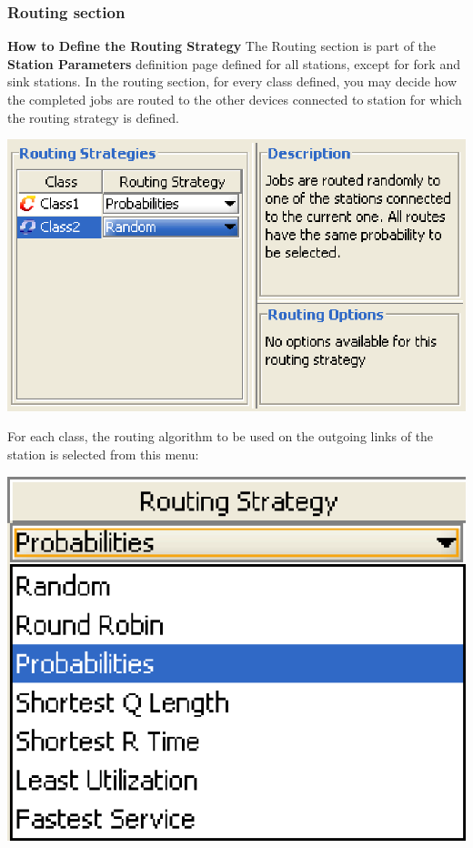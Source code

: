 \subsubsection{Routing section}
\label{sec:RoutingSection} \textbf{How to Define the Routing
Strategy} The Routing section is part of the \textbf{Station
Parameters} definition page defined for all stations, except for
fork and sink stations. In the routing section, for every class
defined, you may decide how the completed jobs are routed to the
other devices connected to station for which the routing strategy
is defined.
\begin{center}
\includegraphics[scale=.5]{img/jsim/routing1.eps}
\end{center}
For each class, the routing algorithm to be used on the outgoing links of the station is selected from this menu:\\
\begin{center}
\includegraphics[scale=.5]{img/jsim/strategy.eps}
\end{center}
